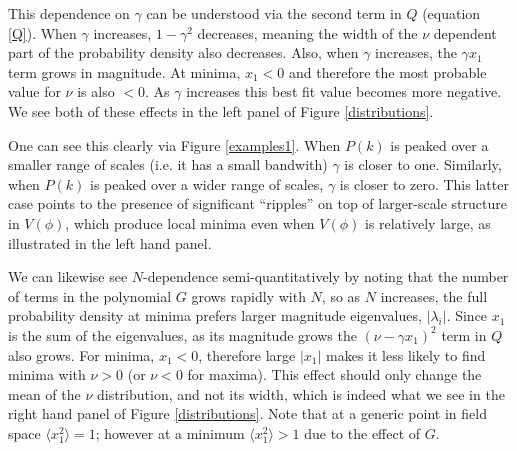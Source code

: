 \documentclass[12pt]{article}
\begin{document}
This dependence on $\gamma$ can be understood via the second term in $Q$ (equation \eqref{Q}). When $\gamma$ increases, $1-\gamma^2$ decreases, meaning the width of the $\nu$ dependent part of the probability density also decreases. Also, when $\gamma$ increases, the $\gamma x_1$ term grows in magnitude. At minima, $x_1 <0$ and therefore the most probable value for $\nu$ is also $<0$. As $\gamma$ increases this best fit value becomes more negative. We see both of these effects in the left panel of Figure \ref{distributions}.

One can see this clearly via Figure \ref{examples1}. When $P(k)$ is peaked over a smaller range of scales (i.e. it has a small bandwith) $\gamma$ is closer to one. Similarly, when $P(k)$ is peaked over a wider range of scales, $\gamma$ is closer to zero. This latter case points to the presence of significant ``ripples'' on top of larger-scale structure in $V(\phi)$, which produce local minima even when $V(\phi)$ is relatively large, as illustrated in the left hand panel.


We can likewise see $N$-dependence semi-quantitatively by noting that the number of terms in the polynomial $G$ grows rapidly with $N$, so as $N$ increases, the full probability density at minima prefers larger magnitude eigenvalues, $|\lambda_i|$. Since $x_1$ is the sum of the eigenvalues, as its magnitude grows the $(\nu-\gamma x_1)^2$ term in $Q$ also grows. For minima, $x_1<0$, therefore large $|x_1|$ makes it less likely to find minima with $\nu >0$ (or $\nu <0 $ for maxima). This effect should only change the mean of the $\nu$ distribution, and not its width, which is indeed what we see in the right hand panel of Figure \ref{distributions}. Note that at a generic point in field space $\langle x_1^2\rangle = 1$; however at a minimum $\langle x_1^2 \rangle >1$ due to the effect of $G$.   
\end{document}
